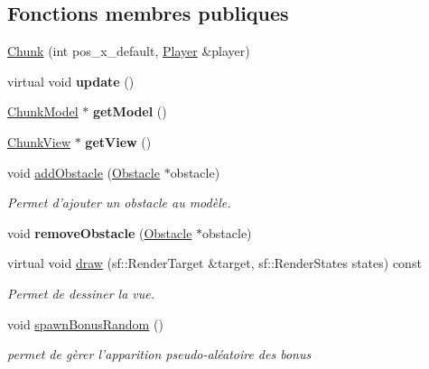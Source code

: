 \subsection*{Fonctions membres publiques}
\begin{DoxyCompactItemize}
\item 
\hyperlink{class_chunk_abac8488478b3c47c2b505a9d7f2ce52e}{Chunk} (int pos\+\_\+x\+\_\+default, \hyperlink{class_player}{Player} \&player)
\item 
\hypertarget{class_chunk_a1cbe00cb7683d46b86908f29fe066f5b}{virtual void {\bfseries update} ()}\label{class_chunk_a1cbe00cb7683d46b86908f29fe066f5b}

\item 
\hypertarget{class_chunk_a916fe2a951062f79ab213644339f7957}{\hyperlink{class_chunk_model}{Chunk\+Model} $\ast$ {\bfseries get\+Model} ()}\label{class_chunk_a916fe2a951062f79ab213644339f7957}

\item 
\hypertarget{class_chunk_a7fc977657d1bcd189e771a76f3feebf6}{\hyperlink{class_chunk_view}{Chunk\+View} $\ast$ {\bfseries get\+View} ()}\label{class_chunk_a7fc977657d1bcd189e771a76f3feebf6}

\item 
\hypertarget{class_chunk_a2db13ffca428e9fc8c9244bbf56f64ed}{void \hyperlink{class_chunk_a2db13ffca428e9fc8c9244bbf56f64ed}{add\+Obstacle} (\hyperlink{class_obstacle}{Obstacle} $\ast$obstacle)}\label{class_chunk_a2db13ffca428e9fc8c9244bbf56f64ed}

\begin{DoxyCompactList}\small\item\em Permet d'ajouter un obstacle au modèle. \end{DoxyCompactList}\item 
\hypertarget{class_chunk_a0740835a46c5566a07757cd8840f6526}{void {\bfseries remove\+Obstacle} (\hyperlink{class_obstacle}{Obstacle} $\ast$obstacle)}\label{class_chunk_a0740835a46c5566a07757cd8840f6526}

\item 
\hypertarget{class_chunk_a9bde8c3d43d03b3739e2f7417bb22648}{virtual void \hyperlink{class_chunk_a9bde8c3d43d03b3739e2f7417bb22648}{draw} (sf\+::\+Render\+Target \&target, sf\+::\+Render\+States states) const }\label{class_chunk_a9bde8c3d43d03b3739e2f7417bb22648}

\begin{DoxyCompactList}\small\item\em Permet de dessiner la vue. \end{DoxyCompactList}\item 
\hypertarget{class_chunk_af9510e63d0aa06ed26566367b9655f0a}{void \hyperlink{class_chunk_af9510e63d0aa06ed26566367b9655f0a}{spawn\+Bonus\+Random} ()}\label{class_chunk_af9510e63d0aa06ed26566367b9655f0a}

\begin{DoxyCompactList}\small\item\em permet de gèrer l'apparition pseudo-\/aléatoire des bonus \end{DoxyCompactList}\end{DoxyCompactItemize}
